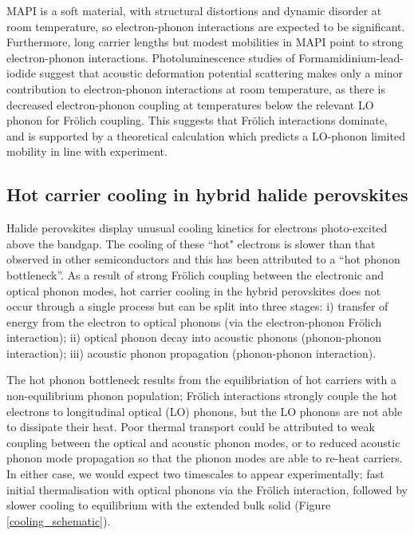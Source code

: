 MAPI is a soft material, with structural distortions and dynamic disorder at room temperature, so electron-phonon interactions are expected to be significant.
Furthermore, long carrier lengths but modest mobilities in MAPI point to strong electron-phonon interactions.\autocite{Brenner2015} 
Photoluminescence studies of Formamidinium-lead-iodide suggest that acoustic deformation potential scattering makes only a minor contribution to electron-phonon interactions at room temperature,\autocite{Wright2016}
as there is decreased electron-phonon coupling at temperatures below the relevant LO phonon for Fr\"{o}lich coupling. This suggests that Fr\"{o}lich interactions dominate, and is supported by a theoretical calculation which predicts a LO-phonon limited mobility in line with experiment.\autocite{Frost2017b}

\subsection{Hot carrier cooling in hybrid halide perovskites}

Halide perovskites display unusual cooling kinetics for electrons photo-excited above the bandgap.
The cooling of these ``hot" electrons is slower than that observed in other semiconductors and this has been attributed to a ``hot phonon bottleneck''.\autocite{Yang2016e,Yang2017a} %
As a result of strong Fr\"{o}lich coupling between the electronic and optical phonon modes, hot carrier cooling in the hybrid perovskites does not occur through a single process but can be split into three stages: i) transfer of energy from the electron to optical phonons (via the electron-phonon Fr\"{o}lich interaction); ii) optical phonon decay into acoustic phonons (phonon-phonon interaction); iii) acoustic phonon propagation (phonon-phonon interaction).

The hot phonon bottleneck results from the equilibriation of hot carriers with a non-equilibrium phonon population;
Fr\"{o}lich interactions strongly couple the hot electrons to longitudinal optical (LO) phonons, but the LO phonons are not able to dissipate their heat. 
Poor thermal transport could be attributed to weak coupling between the optical and acoustic phonon modes, or to reduced acoustic phonon mode propagation so that the phonon modes are able to re-heat carriers.
In either case, we would expect two timescales to appear experimentally; fast initial thermalisation with optical phonons via the Fr\"{o}lich interaction, followed by slower cooling to equilibrium with the extended bulk solid (Figure \ref{cooling_schematic}).

